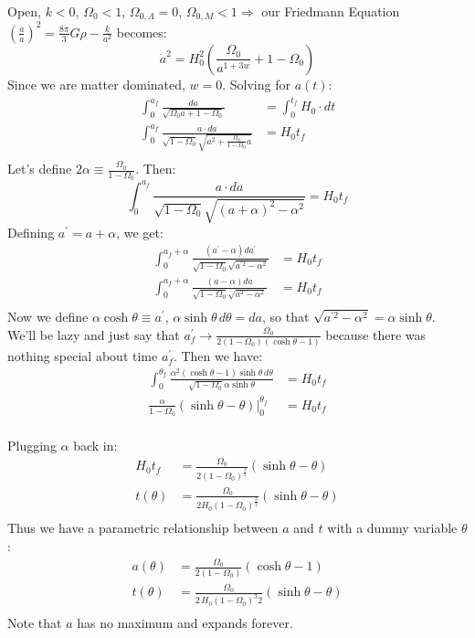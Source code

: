 \documentclass{article}
\def\imply{\Rightarrow}
\def\aa{\frac{\dot a }{ a}}
\def\etot{\Omega_0}
\def\econs{\Omega_{0,\Lambda}}
\def\emat{\Omega_{0,M}}
\def\econs{\Omega_{0,\Lambda}}
\def\epot{\frac{8\pi}{ 3}}
\def\imply{\Rightarrow}
\def\etot{\Omega_0}
\def\econs{\Omega_{0,\Lambda}}
\def\emat{\Omega_{0,M}}
\def\econs{\Omega_{0,\Lambda}}
\def\paap{\left(\aa\right)}
\begin{document}
Open, $k<0$, $\etot<1$, $\econs=0$, $\emat<1\imply$ our Friedmann
Equation $\paap^2=\epot G\rho-\frac{k}{ a^2}$ becomes:
$$\dot a^2=H_0^2\left(\frac{\etot }{ a^{1+3w}}+1-\etot\right)$$  
Since we are matter dominated, $w=0$.  Solving for $a(t)$:
\begin{align}
\int_0^{a_f}\frac{da}{\sqrt{{\etot}{ a}+1-\etot}}
&=\int_0^{t_f}{H_0\cdot dt}\\
\int_0^{a_f}\frac{a\cdot da}{\sqrt{1-\etot}\sqrt{a^2+\frac{\etot}{1-\etot}a}}
&=H_0t_f\\
\end{align}
Let's define $2\alpha\equiv\frac{\etot}{1-\etot}$.  Then:
$$\int_0^{a_f}\frac{a\cdot da}{\sqrt{1-\etot}\sqrt{(a+\alpha)^2-\alpha^2}}
=H_0t_f$$
Defining $a^\prime=a+\alpha$, we get:
\begin{align}
\int_0^{a_f+\alpha}\frac{(a^\prime-\alpha)da^\prime}{ 
\sqrt{1-\etot}\sqrt{a^{\prime 2}-\alpha^2}}&=H_0t_f\\
\int_0^{a_f+\alpha}\frac{(a-\alpha)da}{ \sqrt{1-\etot}\sqrt{a^2-\alpha^2}}
&=H_0t_f\\
\end{align}
Now we define $\alpha\cosh\theta\equiv a^\prime$, 
$\alpha\sinh\theta\,d\theta=da$, so that 
$\sqrt{a^{\prime 2}-\alpha^2}=\alpha\sinh\theta$.  We'll be lazy and
just say that $a_f^\prime\to\frac{\etot }{ 2(1-\etot)(\cosh\theta -1)}$ because
there was nothing special about time $a_f^\prime$. Then we have:
\begin{align}
\int_0^{\theta_f}\frac{\alpha^2(\cosh\theta-1)\sinh\theta\,d\theta}{
\sqrt{1-\etot}\alpha\sinh\theta}&=H_0t_f\\
\frac{\alpha}{1-\etot}(\sinh\theta-\theta)\bigg|_0^{\theta_f}&=H_0t_f\\
\end{align}

Plugging $\alpha$ back in:
\begin{align}
H_0t_f&=\frac{\etot}{2(1-\etot)^\frac{3}{ 2}}(\sinh\theta-\theta)\\
t(\theta)&=\frac{\etot}{2H_0(1-\etot)^\frac{3}{2}}(\sinh\theta-\theta)\\
\end{align}
Thus we have a parametric relationship between $a$ and $t$ with a dummy
variable $\theta$:
\begin{align}a(\theta)&=\frac{\etot}{ 2(1-\etot)}(\cosh\theta-1)\\
t(\theta)&=\frac{\etot}{ 2\,H_0(1-\etot)^{3}{ 2}}(\sinh\theta-\theta)\\
\end{align}
Note that $a$ has no maximum and expands forever.
\end{document}
